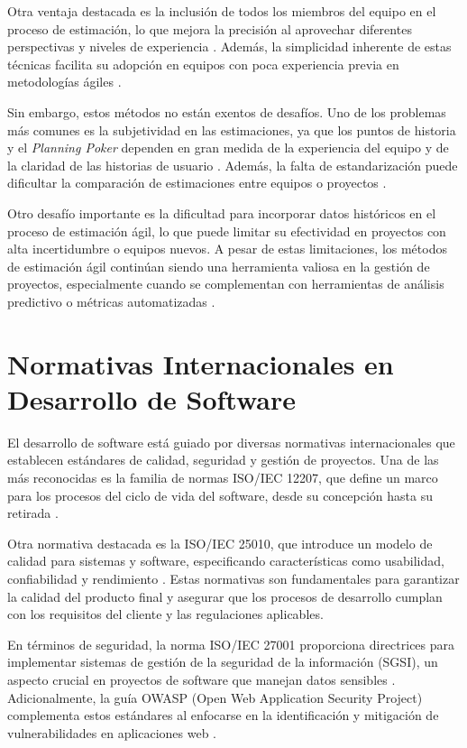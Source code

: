 Otra ventaja destacada es la inclusión de todos los miembros del equipo en el proceso de estimación, lo que mejora la precisión al aprovechar diferentes perspectivas y niveles de experiencia \parencite{schwaber2020scrumguide}. Además, la simplicidad inherente de estas técnicas facilita su adopción en equipos con poca experiencia previa en metodologías ágiles \parencite{anderson2010kanban}.

Sin embargo, estos métodos no están exentos de desafíos. Uno de los problemas más comunes es la subjetividad en las estimaciones, ya que los puntos de historia y el \textit{Planning Poker} dependen en gran medida de la experiencia del equipo y de la claridad de las historias de usuario \parencite{larman2004agile}. Además, la falta de estandarización puede dificultar la comparación de estimaciones entre equipos o proyectos \parencite{boehm2020software}.

Otro desafío importante es la dificultad para incorporar datos históricos en el proceso de estimación ágil, lo que puede limitar su efectividad en proyectos con alta incertidumbre o equipos nuevos. A pesar de estas limitaciones, los métodos de estimación ágil continúan siendo una herramienta valiosa en la gestión de proyectos, especialmente cuando se complementan con herramientas de análisis predictivo o métricas automatizadas \parencite{rubin2012essential}.

\section{Normativas Internacionales en Desarrollo de Software}
El desarrollo de software está guiado por diversas normativas internacionales que establecen estándares de calidad, seguridad y gestión de proyectos. Una de las más reconocidas es la familia de normas ISO/IEC 12207, que define un marco para los procesos del ciclo de vida del software, desde su concepción hasta su retirada \parencite{iso12207}.

Otra normativa destacada es la ISO/IEC 25010, que introduce un modelo de calidad para sistemas y software, especificando características como usabilidad, confiabilidad y rendimiento \parencite{iso25010}. Estas normativas son fundamentales para garantizar la calidad del producto final y asegurar que los procesos de desarrollo cumplan con los requisitos del cliente y las regulaciones aplicables.

En términos de seguridad, la norma ISO/IEC 27001 proporciona directrices para implementar sistemas de gestión de la seguridad de la información (SGSI), un aspecto crucial en proyectos de software que manejan datos sensibles \parencite{iso27001}. Adicionalmente, la guía OWASP (Open Web Application Security Project) complementa estos estándares al enfocarse en la identificación y mitigación de vulnerabilidades en aplicaciones web \parencite{owasp2021}.

